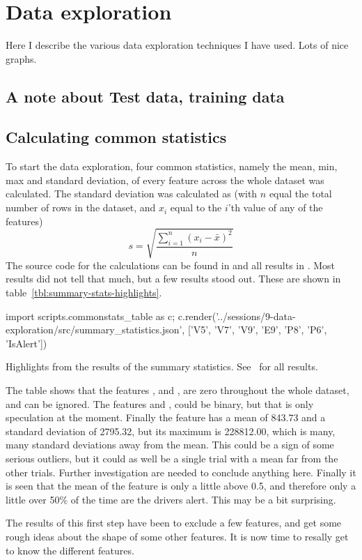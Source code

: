\chapter{Data exploration}
Here I describe the various data exploration techniques I have used. Lots of nice graphs. 


\section{A note about Test data, training data}

\section{Calculating common statistics}\label{sec:summary-statistics}
To start the data exploration, four common statistics, namely the mean, min, max and standard deviation, of every feature across the whole dataset was calculated. The standard deviation was calculated as (with $n$ equal the total number of rows in the dataset, and $x_i$ equal to the $i$'th value of any of the features)
\[
    s = \sqrt{\frac{\sum_{i=1}^n (x_i-\bar{x})^2}{n}}
\]
The source code for the calculations can be found in  and all results in . Most results did not tell that much, but a few results stood out. These are shown in table~\ref{tbl:summary-stats-highlights}.
\begin{table}
    {\small\sffamily
        \begin{python}
            import scripts.commonstats_table as c; c.render('../sessions/9-data-exploration/src/summary_statistics.json', ['V5', 'V7', 'V9', 'E9', 'P8', 'P6', 'IsAlert'])
        \end{python}
    }
    \caption{Highlights from the results of the summary statistics. See~ for all results.}
    \label{tbl:summary-stats-highlights}
\end{table}
The table shows that the features ,  and , are zero throughout the whole dataset, and can be ignored. The features  and , could be binary, but that is only speculation at the moment. Finally the feature  has a mean of 843.73 and a standard deviation of 2795.32, but its maximum is 228812.00, which is many, many standard deviations away from the mean. This could be a sign of some serious outliers, but it could as well be a single trial with a mean far from the other trials. Further investigation are needed to conclude anything here. Finally it is seen that the mean of the  feature is only a little above 0.5, and therefore only a little over 50\% of the time are the drivers alert. This may be a bit surprising. \par
The results of this first step have been to exclude a few features, and get some rough ideas about the shape of some other features. It is now time to resally get to know the different features.

